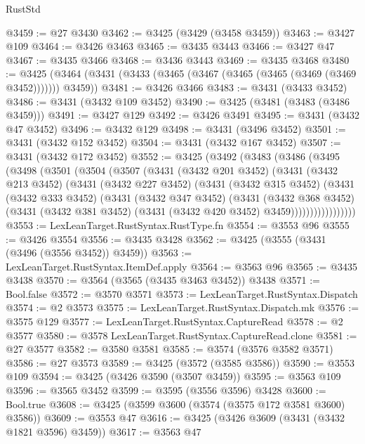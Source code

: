 \begin{lexlean}{RustStd}
\begin{coremodule}
@3459 := @27 @3430
@3462 := @3425 (@3429 (@3458 @3459))
@3463 := @3427 @109
@3464 := @3426 @3463
@3465 := @3435 @3443
@3466 := @3427 @47
@3467 := @3435 @3466
@3468 := @3436 @3443
@3469 := @3435 @3468
@3480 := @3425 (@3464 (@3431 (@3433 (@3465 (@3467 (@3465 (@3465 (@3469 (@3469 @3452))))))) @3459))
@3481 := @3426 @3466
@3483 := @3431 (@3433 @3452)
@3486 := @3431 (@3432 @109 @3452)
@3490 := @3425 (@3481 (@3483 (@3486 @3459)))
@3491 := @3427 @129
@3492 := @3426 @3491
@3495 := @3431 (@3432 @47 @3452)
@3496 := @3432 @129
@3498 := @3431 (@3496 @3452)
@3501 := @3431 (@3432 @152 @3452)
@3504 := @3431 (@3432 @167 @3452)
@3507 := @3431 (@3432 @172 @3452)
@3552 := @3425
    (@3492
      (@3483
        (@3486
          (@3495
            (@3498
              (@3501
                (@3504
                  (@3507
                    (@3431
                      (@3432 @201 @3452)
                      (@3431
                        (@3432 @213 @3452)
                        (@3431
                          (@3432 @227 @3452)
                          (@3431
                            (@3432 @315 @3452)
                            (@3431
                              (@3432 @333 @3452)
                              (@3431
                                (@3432 @347 @3452)
                                (@3431
                                  (@3432 @368 @3452)
                                  (@3431
                                    (@3432 @381 @3452)
                                    (@3431 (@3432 @420 @3452) @3459)))))))))))))))))
@3553 := LexLeanTarget.RustSyntax.RustType.fn
@3554 := @3553 @96
@3555 := @3426 @3554
@3556 := @3435 @3428
@3562 := @3425 (@3555 (@3431 (@3496 (@3556 @3452)) @3459))
@3563 := LexLeanTarget.RustSyntax.ItemDef.apply
@3564 := @3563 @96
@3565 := @3435 @3438
@3570 := @3564 (@3565 (@3435 @3463 @3452)) @3438
@3571 := Bool.false
@3572 := @3570 @3571
@3573 := LexLeanTarget.RustSyntax.Dispatch
@3574 := @2 @3573
@3575 := LexLeanTarget.RustSyntax.Dispatch.mk
@3576 := @3575 @129
@3577 := LexLeanTarget.RustSyntax.CaptureRead
@3578 := @2 @3577
@3580 := @3578 LexLeanTarget.RustSyntax.CaptureRead.clone
@3581 := @27 @3577
@3582 := @3580 @3581
@3585 := @3574 (@3576 @3582 @3571)
@3586 := @27 @3573
@3589 := @3425 (@3572 (@3585 @3586))
@3590 := @3553 @109
@3594 := @3425 (@3426 @3590 (@3507 @3459))
@3595 := @3563 @109
@3596 := @3565 @3452
@3599 := @3595 (@3556 @3596) @3428
@3600 := Bool.true
@3608 := @3425 (@3599 @3600 (@3574 (@3575 @172 @3581 @3600) @3586))
@3609 := @3553 @47
@3616 := @3425 (@3426 @3609 (@3431 (@3432 @1821 @3596) @3459))
@3617 := @3563 @47

\end{coremodule}
\end{lexlean}

